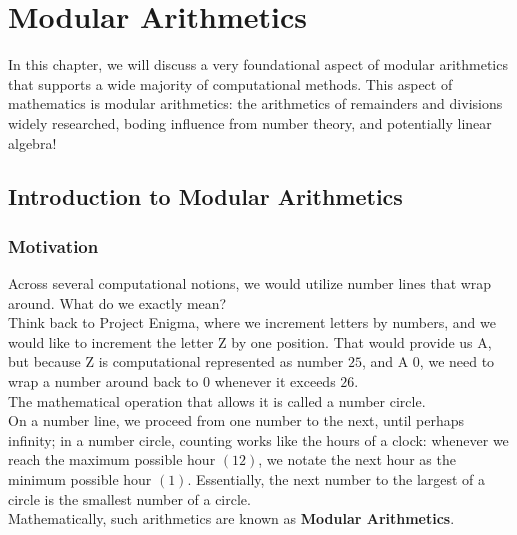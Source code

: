 \chapter{Modular Arithmetics}
In this chapter, we will discuss a very foundational aspect of modular arithmetics that supports a wide majority of computational methods. This aspect of mathematics is modular arithmetics: the arithmetics of remainders and divisions widely researched, boding influence from number theory, and potentially linear algebra!

\section{Introduction to Modular Arithmetics}

\subsection{Motivation}
Across several computational notions, we would utilize number lines that wrap around. What do we exactly mean? \\
Think back to Project Enigma, where we increment letters by numbers, and we would like to increment the letter Z by one position. That would provide us A, but because Z is computational represented as number $25$, and A $0$, we need to wrap a number around back to $0$ whenever it exceeds $26$. \\
The mathematical operation that allows it is called a number circle. \\
On a number line, we proceed from one number to the next, until perhaps infinity; in a number circle, counting works like the hours of a clock: whenever we reach the maximum possible hour $(12)$, we notate the next hour as the minimum possible hour $(1)$. Essentially, the next number to the largest of a circle is the smallest number of a circle. \\
Mathematically, such arithmetics are known as \textbf{Modular Arithmetics}.

